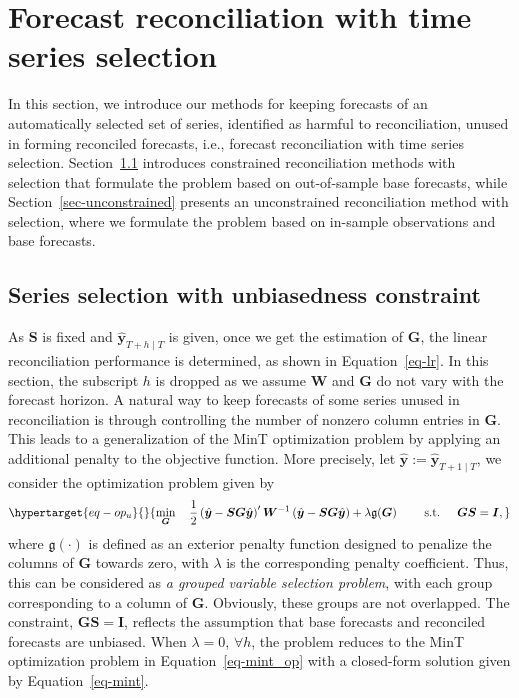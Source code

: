 \documentclass[
  12pt,
  11pt]{article}
\begin{document}
\hypertarget{sec-methodology}{%
\section{Forecast reconciliation with time series
selection}\label{sec-methodology}}

In this section, we introduce our methods for keeping forecasts of an
automatically selected set of series, identified as harmful to
reconciliation, unused in forming reconciled forecasts, i.e., forecast
reconciliation with time series selection. Section~\ref{sec-constrained}
introduces constrained reconciliation methods with selection that
formulate the problem based on out-of-sample base forecasts, while
Section~\ref{sec-unconstrained} presents an unconstrained reconciliation
method with selection, where we formulate the problem based on in-sample
observations and base forecasts.

\hypertarget{sec-constrained}{%
\subsection{Series selection with unbiasedness
constraint}\label{sec-constrained}}

As \(\bm{S}\) is fixed and \(\hat{\bm{y}}_{T+h \mid T}\) is given, once
we get the estimation of \(\bm{G}\), the linear reconciliation
performance is determined, as shown in Equation~\ref{eq-lr}. In this
section, the subscript \(h\) is dropped as we assume \(\bm{W}\) and
\(\bm{G}\) do not vary with the forecast horizon. A natural way to keep
forecasts of some series unused in reconciliation is through controlling
the number of nonzero column entries in \(\bm{G}\). This leads to a
generalization of the MinT optimization problem by applying an
additional penalty to the objective function. More precisely, let
\(\hat{\bm{y}}:=\hat{\bm{y}}_{T+1 \mid T}\), we consider the
optimization problem given by
\begin{equation}\protect\hypertarget{eq-op_u}{}{
\min _{\bm{G}} \quad \frac{1}{2}\left(\hat{\bm{y}}-\bm{SG}\hat{\bm{y}}\right)^{\prime} \bm{W}^{-1}\left(\hat{\bm{y}}-\bm{SG}\hat{\bm{y}}\right)
+ \lambda\mathfrak{g}(\bm{G}) \qquad
\text { s.t. } \quad \bm{GS}=\bm{I},
}\label{eq-op_u}\end{equation} where \(\mathfrak{g}(\cdot)\) is defined
as an exterior penalty function designed to penalize the columns of
\(\bm{G}\) towards zero, with \(\lambda\) is the corresponding penalty
coefficient. Thus, this can be considered as \emph{a grouped variable
selection problem}, with each group corresponding to a column of
\(\bm{G}\). Obviously, these groups are not overlapped. The constraint,
\(\bm{GS}=\bm{I}\), reflects the assumption that base forecasts and
reconciled forecasts are unbiased. When \(\lambda = 0\), \(\forall h\),
the problem reduces to the MinT optimization problem in
Equation~\ref{eq-mint_op} with a closed-form solution given by
Equation~\ref{eq-mint}.
\end{document}
